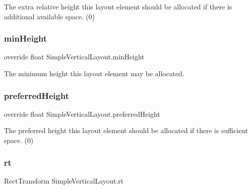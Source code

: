 The extra relative height this layout element should be allocated if there is additional available space. (0) 

\mbox{\label{class_simple_vertical_layout_a6a2d31b8f453ebb0c301f3ff5dfe985f}} 
\subsubsection{\texorpdfstring{min\+Height}{minHeight}}
{\footnotesize\ttfamily override float Simple\+Vertical\+Layout.\+min\+Height\hspace{0.3cm}{\ttfamily [get]}}



The minimum height this layout element may be allocated. 

\mbox{\label{class_simple_vertical_layout_a902b0211bd997ab57b046d814de46c78}} 
\subsubsection{\texorpdfstring{preferred\+Height}{preferredHeight}}
{\footnotesize\ttfamily override float Simple\+Vertical\+Layout.\+preferred\+Height\hspace{0.3cm}{\ttfamily [get]}}



The preferred height this layout element should be allocated if there is sufficient space. (0) 

\mbox{\label{class_simple_vertical_layout_ad795359277af9d73e622eeaa9feb1b56}} 
\subsubsection{\texorpdfstring{rt}{rt}}
{\footnotesize\ttfamily Rect\+Transform Simple\+Vertical\+Layout.\+rt\hspace{0.3cm}{\ttfamily [get]}}




